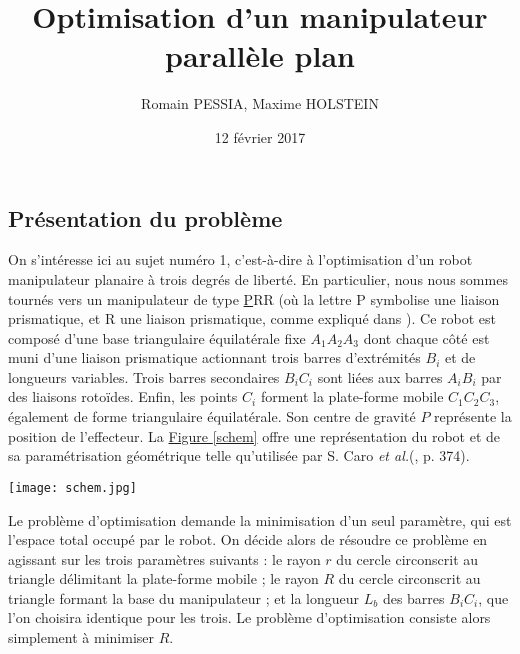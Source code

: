 \documentclass{article}
\title{Optimisation d'un manipulateur parallèle plan}
\author{Romain PESSIA, Maxime HOLSTEIN}
\date{12 février 2017}
\newenvironment{Figure}
  {\par\medskip\noindent\minipage{\linewidth}}
  {\endminipage\par\medskip}
\begin{document}
\maketitle
\begin{multicols*}{2}

\section*{Présentation du problème}

On s'intéresse ici au sujet numéro 1, c'est-à-dire à l'optimisation d'un robot manipulateur planaire à trois degrés de liberté. En particulier, nous nous sommes tournés vers un manipulateur de type \underline{P}RR (où la lettre P symbolise une liaison prismatique, et R une liaison prismatique, comme expliqué dans \cite{merl06}). Ce robot est composé d'une base triangulaire équilatérale fixe $A_1 A_2 A_3$ dont chaque côté est muni d'une liaison prismatique actionnant trois barres d'extrémités $B_i$ et de longueurs variables. Trois barres secondaires $B_i C_i$ sont liées aux barres $A_i B_i$ par des liaisons rotoïdes. Enfin, les points $C_i$ forment la plate-forme mobile $C_1 C_2 C_3$, également de forme triangulaire équilatérale. Son centre de gravité  $P$ représente la position de l'effecteur. La \hyperref[schem]{Figure \ref{schem}} offre une représentation du robot et de sa paramétrisation géométrique telle qu'utilisée par S. Caro \textit{et al.}(\cite{caro11}, p. 374). 

\begin{Figure}
        \texttt{[image: schem.jpg]}
        \label{schem}
\end{Figure}

Le problème d'optimisation demande la minimisation d'un seul paramètre, qui est l'espace total occupé par le robot. On décide alors de résoudre ce problème en agissant sur les trois paramètres suivants : le rayon $r$ du cercle circonscrit au triangle délimitant la plate-forme mobile ; le rayon $R$ du cercle circonscrit au triangle formant la base du manipulateur ; et la longueur $L_b$ des barres $B_i C_i$, que l'on choisira identique pour les trois. Le problème d'optimisation consiste alors simplement à minimiser $R$. 


\end{multicols*}
\end{document}
